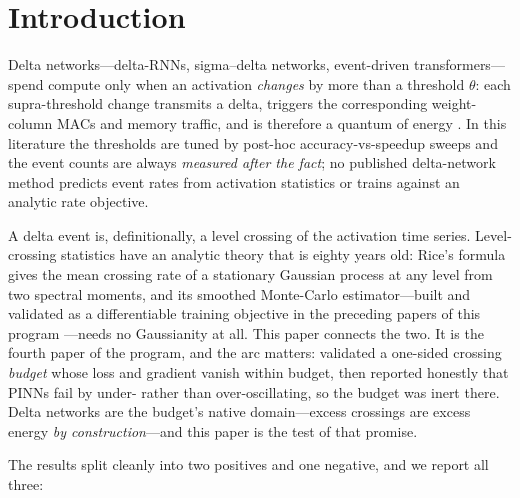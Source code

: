 \documentclass[10pt]{article}
\begin{document}
\section{Introduction}

Delta networks---delta-RNNs, sigma--delta networks, event-driven
transformers---spend compute only when an activation \emph{changes} by more
than a threshold $\theta$: each supra-threshold change transmits a delta,
triggers the corresponding weight-column MACs and memory traffic, and is
therefore a quantum of energy \citep{neil2017delta,oconnor2017sigmadelta,
yousefzadeh2022delta,gao2020edgedrnn,chen2024deltakws}. In this literature
the thresholds are tuned by post-hoc accuracy-vs-speedup sweeps and the
event counts are always \emph{measured after the fact}; no published
delta-network method predicts event rates from activation statistics or
trains against an analytic rate objective.

A delta event is, definitionally, a level crossing of the activation time
series. Level-crossing statistics have an analytic theory that is eighty
years old: Rice's formula \citep{rice1944,kac1943} gives the mean crossing
rate of a stationary Gaussian process at any level from two spectral
moments, and its smoothed Monte-Carlo estimator---built and validated as a
differentiable training objective in the preceding papers of this program
\citep{howe2026levelcrossing,howe2026budget,howe2026minkowski}---needs no
Gaussianity at all. This paper connects the two. It is the fourth paper of
the program, and the arc matters: \citet{howe2026budget} validated a
one-sided crossing \emph{budget} whose loss and gradient vanish within
budget, then reported honestly that PINNs fail by under- rather than
over-oscillating, so the budget was inert there. Delta networks are the
budget's native domain---excess crossings are excess energy \emph{by
construction}---and this paper is the test of that promise.

The results split cleanly into two positives and one negative, and we
report all three:
\end{document}
